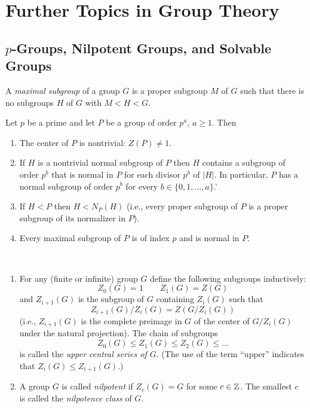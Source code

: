 \documentclass[../main]{subfiles}
\begin{document}
\section{Further Topics in Group Theory}


\subsection{$p$-Groups, Nilpotent Groups, and Solvable Groups}


\begin{dfn}
 A \textit{maximal subgroup} of a group $G$ is a proper subgroup $M$ of $G$ such that there is no subgroups $H$ of $G$ with $M < H < G$.
\end{dfn}


\begin{thm}
 Let $p$ be a prime and let $P$ be a group of order $p^a$, $a\geq 1$. Then
 \begin{enumerate}
  \item The center of $P$ is nontrivial: $Z(P) \neq 1$.
  
  \item If $H$ is a nontrivial normal subgroup of $P$ then $H$ contains a subgroup of order $p^b$ that is normal in $P$ for each divisor $p^b$ of $|H|$. In particular, $P$ has a normal subgroup of order $p^b$ for every $b \in \{0,1, \ldots , a\}$.'
  
  \item If $H < P$ then $H < N_P(H)$ (i.e., every proper subgroup of $P$ is a proper subgroup of its normalizer in $P$).
  
  \item Every maximal subgroup of $P$ is of index $p$ and is normal in $P$. 
 \end{enumerate}
\end{thm}


\begin{dfn}
 ~\begin{enumerate}
   \item For any (finite or infinite) group $G$ define the following subgroups inductively:
   \[ Z_0(G) = 1 \qquad Z_1(G) = Z(G) \]
   and $Z_{i+1}(G)$ is the subgroup of $G$ containing $Z_i(G)$ such that 
   \[ Z_{i+1}(G)/Z_i(G) = Z(G/Z_i(G)) \]
   (i.e., $Z_{i+1}(G)$ is the complete preimage in $G$ of the center of $G/Z_i(G)$ under the natural projection). The chain of subgroups
   \[ Z_0(G) \leq Z_1(G) \leq Z_2(G) \leq \ldots \]
   is called the \textit{upper central series of $G$}. (The use of the term ``upper'' indicates that $Z_i(G) \leq Z_{i+1}(G)$.)
   
   \item A group $G$ is called \textit{nilpotent} if $Z_c(G) = G$ for some $c\in \mathbb{Z}$. The smallest $c$ is called the \textit{nilpotence class} of $G$.
  \end{enumerate}
\end{dfn}
\end{document}
